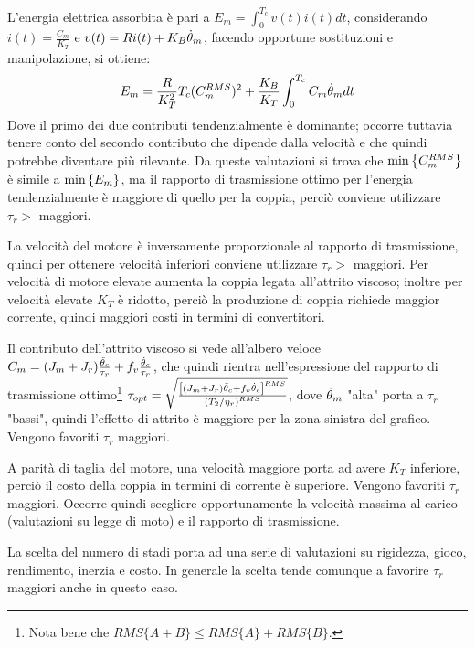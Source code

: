 L'energia elettrica assorbita è pari a \(E_m = \int^{T_c}_0 v(t) i(t) dt\),  considerando \(i(t)=\frac{C_m}{K_T}\) e \(v(t) = R i(t) + K_B \dot{\theta}_m\), facendo opportune sostituzioni e manipolazione, si ottiene:
\[ E_m = \frac{R}{K_T^2} T_c (C^{RMS}_m)^2 + \frac{K_B}{K_T} \int^{T_c}_0 C_m\dot{\theta}_m dt \]
Dove il primo dei due contributi tendenzialmente è dominante; occorre tuttavia tenere conto del secondo contributo che dipende dalla velocità e che quindi potrebbe diventare più rilevante.
Da queste valutazioni si trova che \(\operatorname{min}\left\{ C_m^{RMS} \right\}\) è simile a \(\operatorname{min}\left\{ E_m \right\}\), ma il rapporto di trasmissione ottimo per l'energia tendenzialmente è maggiore di quello per la coppia, perciò conviene utilizzare \(\tau_r >\) maggiori.

La velocità del motore è inversamente proporzionale al rapporto di trasmissione, quindi per ottenere velocità inferiori conviene utilizzare \(\tau_r >\) maggiori.
Per velocità di motore elevate aumenta la coppia legata all'attrito viscoso; inoltre per velocità elevate \(K_T\) è ridotto, perciò la produzione di coppia richiede maggior corrente, quindi maggiori costi in termini di convertitori.

Il contributo dell'attrito viscoso si vede all'albero veloce \(C_m = (J_m+J_r)\frac{\Ddot{\theta}_c}{\tau_r} + f_v \frac{\dot{\theta}_c}{\tau_r}\), che quindi rientra nell'espressione del rapporto di trasmissione ottimo\footnote{Nota bene che \(RMS\{A+B\}\leqslant RMS\{A\} +RMS\{B\}\).} \(\tau_{opt} = \sqrt{\frac{\left[(J_m + J_r)\Ddot{\theta}_c+f_v \dot{\theta}_c\right]^{RMS}}{\left(T_2/\eta_r\right)^{RMS}}}\), dove \(\dot{\theta}_m\) "alta" porta a \(\tau_r\) "bassi", quindi l'effetto di attrito è maggiore per la zona sinistra del grafico. Vengono favoriti \(\tau_r\) maggiori.

A parità di taglia del motore, una velocità maggiore porta ad avere \(K_T\) inferiore, perciò il costo della coppia in termini di corrente è superiore. Vengono favoriti \(\tau_r\) maggiori.
Occorre quindi scegliere opportunamente la velocità massima al carico (valutazioni su legge di moto) e il rapporto di trasmissione.

La scelta del numero di stadi porta ad una serie di valutazioni su rigidezza, gioco, rendimento, inerzia e costo.
In generale la scelta tende comunque a favorire \(\tau_r\) maggiori anche in questo caso.

